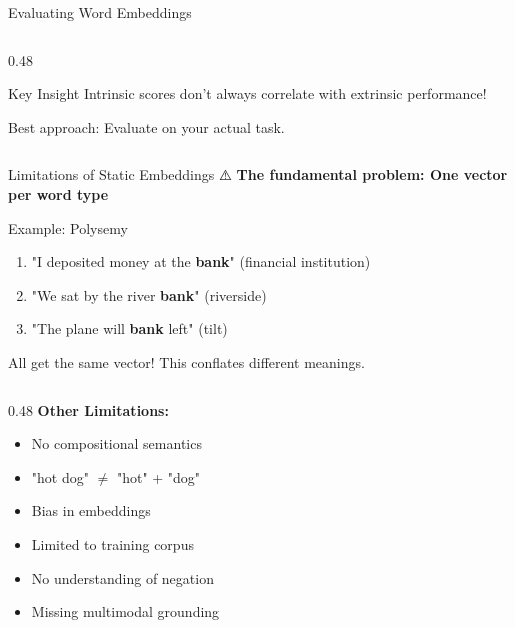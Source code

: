 \documentclass[aspectratio=169]{beamer}
\begin{document}
\begin{frame}[shrink=10]{Evaluating Word Embeddings 📏}
\begin{columns}[T]
\begin{column}{0.48\textwidth}
\vspace{1em}
\begin{alertblock}{Key Insight}
Intrinsic scores don't always correlate with extrinsic performance!

Best approach: Evaluate on your actual task.
\end{alertblock}
\end{column}
\end{columns}
\end{frame}

\begin{frame}[shrink=10]{Limitations of Static Embeddings ⚠️}
\textbf{The fundamental problem: One vector per word type}

\vspace{1em}

\begin{exampleblock}{Example: Polysemy}
\begin{enumerate}\setlength{\itemsep}{0pt}
    \item "I deposited money at the \textbf{bank}" (financial institution)
    \item "We sat by the river \textbf{bank}" (riverside)
    \item "The plane will \textbf{bank} left" (tilt)
\end{enumerate}
All get the \alert{same vector}! This conflates different meanings.
\end{exampleblock}

\vspace{1em}

\begin{columns}[T]
\begin{column}{0.48\textwidth}
\textbf{Other Limitations:}
\begin{itemize}\setlength{\itemsep}{0pt}
    \item No compositional semantics
    \item "hot dog" $\neq$ "hot" + "dog"
    \item Bias in embeddings
    \item Limited to training corpus
    \item No understanding of negation
    \item Missing multimodal grounding
\end{itemize}
\end{column}


\end{columns}
\end{frame}
\end{document}
